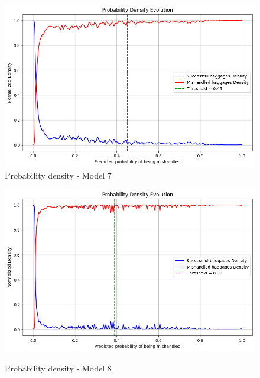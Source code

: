 \documentclass[12pt]{article}
\begin{document}
\begin{figure}
\begin{minipage}[c]{0.5\linewidth}
    \includegraphics[width=1\textwidth]{Probability_density_Model 7.png}\\
    \caption{Probability density - Model 7}
\end{minipage}
\hfill
\begin{minipage}[c]{0.5\linewidth}
    \includegraphics[width=1\textwidth]{Probability_density_Model 8.png}\\
    \caption{Probability density - Model 8}
\end{minipage}%
\end{figure}
\FloatBarrier
\end{document}
